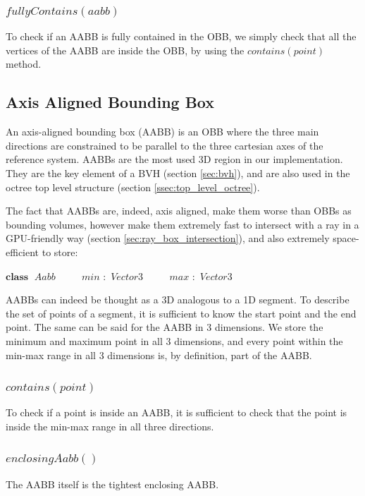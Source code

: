 \documentclass{PoliMi_MasterThesis}
\newcommand*\Class[1]{\State $\textbf{class} \;$ #1}
\newcommand*\Member[2]{\State $\qquad$ #1 $:$ #2}
\begin{document}
\subsubsection*{$fullyContains(aabb)$}
To check if an AABB is fully contained in the OBB, we simply check that all the vertices of the AABB are inside the OBB, by using the $contains(point)$ method.

\subsection{Axis Aligned Bounding Box} \label{ssec:aabb}
An axis-aligned bounding box (AABB) is an OBB where the three main directions are constrained to be parallel to the three cartesian axes of the reference system. AABBs are the most used 3D region in our implementation. They are the key element of a BVH (section \ref{sec:bvh}), and are also used in the octree top level structure (section \ref{ssec:top_level_octree}).

The fact that AABBs are, indeed, axis aligned, make them worse than OBBs as bounding volumes, however make them extremely fast to intersect with a ray in a GPU-friendly way (section \ref{sec:ray_box_intersection}), and also extremely space-efficient to store:
\begin{algorithm}[H]
	\begin{algorithmic}
		\Class{$Aabb$}
		\Member{$min$}{$Vector3$}
		\Member{$max$}{$Vector3$}
	\end{algorithmic}
\end{algorithm} 

AABBs can indeed be thought as a 3D analogous to a 1D segment. To describe the set of points of a segment, it is sufficient to know the start point and the end point. The same can be said for the AABB in 3 dimensions. We store the minimum and maximum point in all 3 dimensions, and every point within the min-max range in all 3 dimensions is, by definition, part of the AABB.

\subsubsection*{$contains(point)$}
To check if a point is inside an AABB, it is sufficient to check that the point is inside the min-max range in all three directions.

\subsubsection*{$enclosingAabb()$}
The AABB itself is the tightest enclosing AABB.
\end{document}
